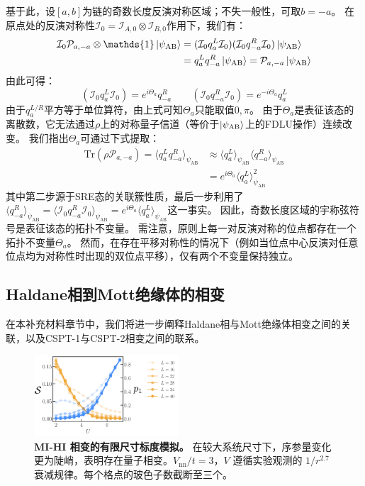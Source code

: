 \documentclass[preprint,superscriptaddress,floatfix,nofootinbib]{revtex4-2}
\begin{document}
基于此，设$[a, b]$为链的奇数长度反演对称区域；不失一般性，可取$b = -a$。
在原点处的反演对称性$\mathcal{I}_0 = \mathcal{I}_{A, 0} \otimes \mathcal{I}_{B, 0}$作用下，我们有：
\begin{align}
    \mathcal{I}_{0} \mathcal{P}_{a, -a} \otimes \mathds{1} \ket{\psi_{\text{AB}}} &= (\mathcal{I}_0 q_{a}^L \mathcal{I}_0)(\mathcal{I}_0 q_{-a}^R \mathcal{I}_0) \ket{\psi_{\text{AB}}} \nonumber\\
    &= q_{a}^L q_{-a}^{R}\ket{\psi_{\text{AB}}} = \mathcal{P}_{a,-a} \ket{\psi_{\text{AB}}}
\end{align}
由此可得：
\begin{equation}
     (\mathcal{I}_0 q_{a}^L \mathcal{I}_0) = e^{i \Theta_a} q_{-a}^{R} \qquad (\mathcal{I}_0 q_{-a}^R \mathcal{I}_0) = e^{-i \Theta_a} q_{a}^{L}
\end{equation}
由于$q_a^{L/R}$平方等于单位算符，由上式可知$\Theta_a$只能取值$0, \pi$。
由于$\Theta_a$是表征该态的离散数，它无法通过$\rho$上的对称量子信道（等价于$\ket{\psi_{\text{AB}}}$上的FDLU操作）连续改变。
我们指出$\Theta_a$可通过下式提取：
\begin{align}
    \text{Tr}\left(\rho \mathcal{P}_{a, -a} \right) = \langle q_a^L q_{-a}^R \rangle_{\psi_{\text{AB}}} &\approx \langle q^L_a \rangle_{\psi_{\text{AB}}} \langle q^R_{-a} \rangle_{\psi_{\text{AB}}}\\
    &= e^{i \Theta_a} \langle q_a^L \rangle^2_{\psi_{\text{AB}}}
\end{align}
其中第二步源于SRE态的关联簇性质，最后一步利用了$\langle q_{-a}^R \rangle_{\psi_{\text{AB}}} = \langle \mathcal{I}_0 q_{-a}^R \mathcal{I}_0 \rangle_{\psi_{\text{AB}}} = e^{i \Theta_a} \langle q_a^{L} \rangle_{\psi_{\text{AB}}}$这一事实。
因此，奇数长度区域的宇称弦符号是表征该态的拓扑不变量。
需注意，原则上每一对反演对称的位点都存在一个拓扑不变量$\Theta_a$。
然而，在存在平移对称性的情况下（例如当位点中心反演对任意位点均为对称性时出现的双位点平移），仅有两个不变量保持独立\cite{Sahay2025}。
\subsection*{Haldane相到Mott绝缘体的相变}

在本补充材料章节中，我们将进一步阐释Haldane相与Mott绝缘体相变之间的关联，以及CSPT-1与CSPT-2相变之间的联系。

\begin{figure}
    \centering
    \includegraphics[width=0.48\textwidth]{figures/Finite_size_scaling.pdf}
    \caption{\textbf{MI-HI 相变的有限尺寸标度模拟。} 在较大系统尺寸下，序参量变化更为陡峭，表明存在量子相变。$V_\mathrm{nn}/t=3$，$V$ 遵循实验观测的 $1/r^{2.7}$ 衰减规律。每个格点的玻色子数截断至三个。}
    \label{fig: finite_size_scaling}
\end{figure}
\end{document}
